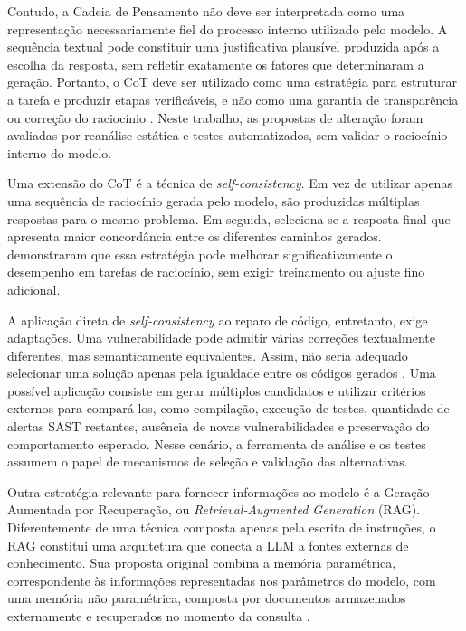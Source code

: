 Contudo, a Cadeia de Pensamento não deve ser interpretada como uma representação necessariamente fiel do processo interno utilizado pelo modelo. A sequência textual pode constituir uma justificativa plausível produzida após a escolha da resposta, sem refletir exatamente os fatores que determinaram a geração. Portanto, o CoT deve ser utilizado como uma estratégia para estruturar a tarefa e produzir etapas verificáveis, e não como uma garantia de transparência ou correção do raciocínio \cite{lester_power_2021}. Neste trabalho, as propostas de alteração foram avaliadas por reanálise estática e testes automatizados, sem validar o raciocínio interno do modelo.

Uma extensão do CoT é a técnica de \textit{self-consistency}. Em vez de utilizar apenas uma sequência de raciocínio gerada pelo modelo, são produzidas múltiplas respostas para o mesmo problema. Em seguida, seleciona-se a resposta final que apresenta maior concordância entre os diferentes caminhos gerados.  demonstraram que essa estratégia pode melhorar significativamente o desempenho em tarefas de raciocínio, sem exigir treinamento ou ajuste fino adicional.

A aplicação direta de \textit{self-consistency} ao reparo de código, entretanto, exige adaptações. Uma vulnerabilidade pode admitir várias correções textualmente diferentes, mas semanticamente equivalentes. Assim, não seria adequado selecionar uma solução apenas pela igualdade entre os códigos gerados \cite{wang_self-consistency_2023}. Uma possível aplicação consiste em gerar múltiplos candidatos e utilizar critérios externos para compará-los, como compilação, execução de testes, quantidade de alertas SAST restantes, ausência de novas vulnerabilidades e preservação do comportamento esperado. Nesse cenário, a ferramenta de análise e os testes assumem o papel de mecanismos de seleção e validação das alternativas.

Outra estratégia relevante para fornecer informações ao modelo é a Geração Aumentada por Recuperação, ou \textit{Retrieval-Augmented Generation} (RAG). Diferentemente de uma técnica composta apenas pela escrita de instruções, o RAG constitui uma arquitetura que conecta a LLM a fontes externas de conhecimento. Sua proposta original combina a memória paramétrica, correspondente às informações representadas nos parâmetros do modelo, com uma memória não paramétrica, composta por documentos armazenados externamente e recuperados no momento da consulta \cite{klesel_retrieval-augmented_2025}.

